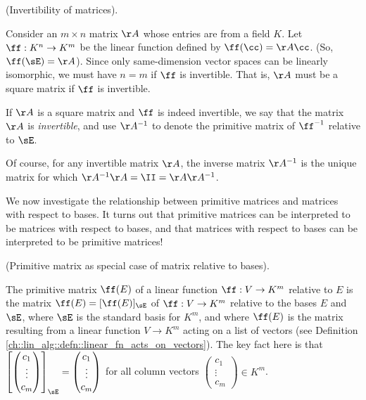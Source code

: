 \begin{defn}
    (Invertibility of matrices).
    
    Consider an $m \times n$ matrix $\AA$ whose entries are from a field $K$. Let $\ff:K^n \rightarrow K^m$ be the linear function defined by $\ff(\cc) = \AA \cc$. (So, $\ff(\sE) = \AA$). Since only same-dimension vector spaces can be linearly isomorphic, we must have $n = m$ if $\ff$ is invertible. That is, $\AA$ must be a square matrix if $\ff$ is invertible.
    
    If $\AA$ is a square matrix and $\ff$ is indeed invertible, we say that the matrix $\AA$ is \textit{invertible}, and use $\AA^{-1}$ to denote the primitive matrix of $\ff^{-1}$ relative to $\sE$.
    
    Of course, for any invertible matrix $\AA$, the inverse matrix $\AA^{-1}$ is the unique matrix for which ${\AA^{-1} \AA = \II = \AA \AA^{-1}}$.
\end{defn}

We now investigate the relationship between primitive matrices and matrices with respect to bases. It turns out that primitive matrices can be interpreted to be matrices with respect to bases, and that matrices with respect to bases can be interpreted to be primitive matrices!

\begin{remark}
\label{ch::lin_alg::rmk::primitive_matrix_as_matrix_wrt_bases}

    (Primitive matrix as special case of matrix relative to bases). 
    
    The primitive matrix $\ff(E)$ of a linear function $\ff:V \rightarrow K^m$ relative to $E$ is the matrix $\ff(E) = [\ff(E)]_{\sE}$ of $\ff:V \rightarrow K^m$ relative to the bases $E$ and $\sE$, where $\sE$ is the standard basis for $K^m$, and where $\ff(E)$ is the matrix resulting from a linear function $V \rightarrow K^m$ acting on a list of vectors (see Definition \ref{ch::lin_alg::defn::linear_fn_acts_on_vectors}). The key fact here is that $\left[\begin{pmatrix} c_1 \\ \vdots \\ c_m \end{pmatrix}\right]_\sE = \begin{pmatrix} c_1 \\ \vdots \\ c_m \end{pmatrix}$ for all column vectors $\begin{pmatrix} c_1 \\ \vdots \\ c_m \end{pmatrix} \in K^m$.
\end{remark}

